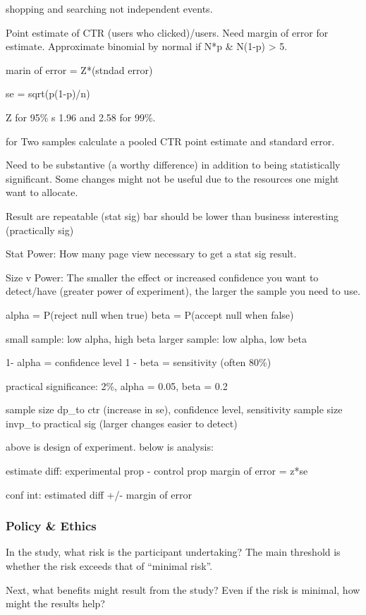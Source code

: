 \documentclass[]{book}
\theoremstyle{definition}
\theoremstyle{definition}
\theoremstyle{definition}
\theoremstyle{remark}
\begin{document}
shopping and searching not independent events.

Point estimate of CTR (users who clicked)/users. Need margin of error
for estimate. Approximate binomial by normal if N*p \& N(1-p)
\textgreater{} 5.

marin of error = Z*(stndad error)

se = sqrt(p(1-p)/n)

Z for 95\% s 1.96 and 2.58 for 99\%.

for Two samples calculate a pooled CTR point estimate and standard
error.

Need to be substantive (a worthy difference) in addition to being
statistically significant. Some changes might not be useful due to the
resources one might want to allocate.

Result are repeatable (stat sig) bar should be lower than business
interesting (practically sig)

Stat Power: How many page view necessary to get a stat sig result.

Size v Power: The smaller the effect or increased confidence you want to
detect/have (greater power of experiment), the larger the sample you
need to use.

alpha = P(reject null when true) beta = P(accept null when false)

small sample: low alpha, high beta larger sample: low alpha, low beta

1- alpha = confidence level 1 - beta = sensitivity (often 80\%)

practical significance: 2\%, alpha = 0.05, beta = 0.2

sample size dp\_to ctr (increase in se), confidence level, sensitivity
sample size invp\_to practical sig (larger changes easier to detect)

above is design of experiment. below is analysis:

estimate diff: experimental prop - control prop margin of error = z*se

conf int: estimated diff +/- margin of error

\subsubsection{Policy \& Ethics}\label{policy-ethics}

In the study, what risk is the participant undertaking? The main
threshold is whether the risk exceeds that of ``minimal risk''.

Next, what benefits might result from the study? Even if the risk is
minimal, how might the results help?
\end{document}
